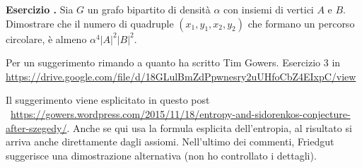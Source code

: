 \documentclass[10pt]{article}
\newcounter{ex}
\newenvironment{exercise}{\addtocounter{ex}{1}\textbf{Esercizio \theex.\quad}}{}
\begin{document}
\begin{exercise}
  Sia $G$ un grafo bipartito di densità $\alpha$ con insiemi di vertici $A$ e $B$. Dimostrare che il numero di quadruple $(x_1,y_1,x_2,y_2)$ che formano un percorso circolare, è almeno $\alpha^4|A|^2|B|^2$.

  Per un suggerimento rimando a quanto ha scritto Tim Gowers. Esercizio 3 in \url{https://drive.google.com/file/d/18GLulBmZdPpwnesry2uUHfoCbZ4EIxpC/view}

  Il suggerimento viene esplicitato in questo post \ \url{https://gowers.wordpress.com/2015/11/18/entropy-and-sidorenkos-conjecture-after-szegedy/}. Anche se qui usa la formula esplicita dell'entropia, al risultato si arriva anche direttamente dagli assiomi.
  Nell'ultimo dei commenti, Friedgut suggerisce una dimostrazione alternativa (non ho controllato i dettagli).
\end{exercise}
\end{document}
